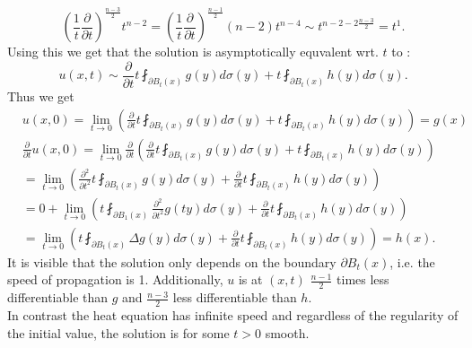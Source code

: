 \documentclass[A4,12pt,twoside]{book}
\begin{document}
{    \[
    \left( \frac{1}{t} \frac{\partial}{\partial t} \right)^{\frac{n-3}{2}} t^{n-2} = \left( \frac{1}{t} \frac{\partial}{\partial t} \right)^{\frac{n-1}{2}} (n-2) t^{n-4}  \sim t^{n-2- 2 \frac{n-3}{2}} = t^1.
    \]
    Using this we get that the solution is asymptotically equvalent wrt. $t$ to :
    \[
    u(x,t) \sim \frac{\partial}{\partial t} t \fint_{\partial B_t (x)} g(y) d \sigma (y) + t \fint_{\partial B_t(x)} h(y) d \sigma (y).
    \]
    Thus we get 
    \begin{align*}
     & u(x,0)=  \lim_{t \to 0} \left( \frac{\partial}{\partial t} t \fint_{\partial B_t (x)} g(y) d \sigma (y) + t \fint_{\partial B_t(x)} h(y) d \sigma (y) \right) = g(x) \\
      &\frac{\partial}{\partial t} u(x,0) = \lim_{t \to 0} \frac{\partial}{\partial t} \left( \frac{\partial}{\partial t} t \fint_{\partial B_t (x)} g(y) d \sigma (y) + t \fint_{\partial B_t(x)} h(y) d \sigma (y) \right) \\
      &= \lim_{t \to 0}  \left( \frac{\partial^2}{\partial t^2} t \fint_{\partial B_t (x)} g(y) d \sigma (y) +\frac{\partial}{\partial t} t \fint_{\partial B_t(x)} h(y) d \sigma (y) \right) \\
      &=0+ \lim_{t \to 0}  \left(  t \fint_{\partial B_1 (x)} \frac{\partial^2}{\partial t^2} g(ty) d \sigma (y) +\frac{\partial}{\partial t} t \fint_{\partial B_t(x)} h(y) d \sigma (y) \right) \\
      &=  \lim_{t \to 0}  \left(  t \fint_{\partial B_t (x)}\Delta g(y) d \sigma (y) +\frac{\partial}{\partial t} t \fint_{\partial B_t(x)} h(y) d \sigma (y) \right) =h(x).
    \end{align*}
}
It is visible that the solution only depends on the boundary $\partial B_t (x)$, i.e.  the speed of propagation is 1. Additionally, $u$ is at $(x,t)$ $\frac{n-1}{2}$ times less differentiable than $g$ and $\frac{n-3}{2}$ less differentiable than $h$.\\
In contrast the heat equation has infinite speed and regardless of the regularity of the initial value, the solution is for some $t>0$ smooth.
\end{document}
